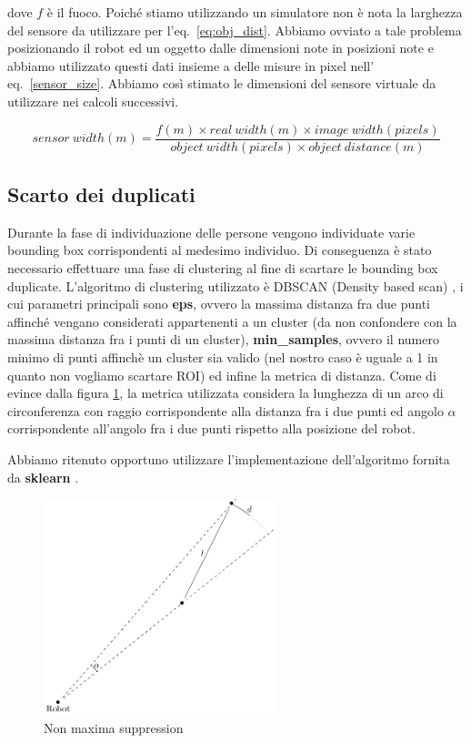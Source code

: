 \documentclass[a4paper]{article}
\begin{document}
	dove $f$ è il fuoco. Poiché stiamo utilizzando un simulatore non è nota la larghezza del sensore
	da utilizzare per l'eq.~\ref{eq:obj_dist}. Abbiamo ovviato a tale problema
	posizionando il robot ed un oggetto dalle dimensioni note in posizioni note
	e abbiamo utilizzato questi dati insieme a delle misure in pixel nell'
	eq.~\ref{sensor_size}. Abbiamo così stimato le dimensioni del sensore
	virtuale da utilizzare nei calcoli successivi.

	\begin{equation}\label{sensor_size}
	sensor~width(m) = 
	\frac{f(m) \times real~width(m) \times image~width(pixels)}
	{object~width(pixels) \times object~distance(m)}
	\end{equation}
	
	\subsection{Scarto dei duplicati}\label{subsec:Scarto-dei-duplicati}
	Durante la fase di individuazione delle persone vengono individuate varie bounding box corrispondenti al medesimo individuo. Di conseguenza è stato necessario effettuare una fase di clustering al fine di scartare le bounding box duplicate. L'algoritmo di clustering utilizzato è DBSCAN (Density based scan) \cite{dbscan}, i cui parametri principali sono \textbf{eps}, ovvero la massima distanza fra due punti affinché vengano considerati appartenenti a un cluster (da non confondere con la massima distanza fra i punti di un cluster), \textbf{min\_samples}, ovvero il numero minimo di punti affinchè un cluster sia valido (nel nostro caso è uguale a 1 in quanto non vogliamo scartare ROI) ed infine la metrica di distanza. 
	Come di evince dalla figura \ref{fig:nms}, la metrica utilizzata considera la lunghezza di un arco di circonferenza con raggio corrispondente alla distanza fra i due punti ed angolo $\alpha$ corrispondente  all'angolo fra i due punti rispetto alla posizione del robot.
	
	Abbiamo ritenuto opportuno utilizzare l'implementazione dell'algoritmo fornita da \textbf{sklearn} \cite{scikit}.
	
	\begin{figure}[H]
		\centering
		\includegraphics[width=0.6\textwidth]{./img/nms.pdf}
		\caption{Non maxima suppression}
		\label{fig:nms}
	\end{figure}
\end{document}
